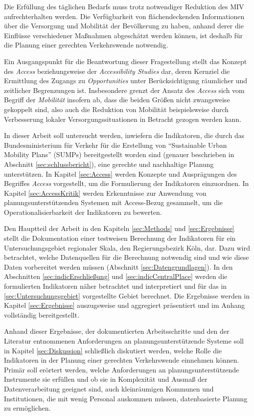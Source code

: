 \documentclass[11pt,pdftex,a4paper]{scrartcl}
\begin{document}
	Die Erfüllung des täglichen Bedarfs muss trotz notwendiger Reduktion des MIV aufrechterhalten werden. Die Verfügbarkeit von flächendeckenden Informationen über die Versorgung und Mobilität der Bevölkerung zu haben, anhand derer die Einflüsse verschiedener Maßnahmen abgeschätzt werden können, ist deshalb für die Planung einer gerechten Verkehrswende notwendig.
	
	Ein Ausgangspunkt für die Beantwortung dieser Fragestellung stellt das Konzept des \textit{Access} beziehungsweise der \textit{Accessibility Studies} dar, deren Kernziel die Ermittlung des Zugangs zu \textit{Opportunities} unter Berücksichtigung räumlicher und zeitlicher Begrenzungen ist. Insbesondere grenzt der Ansatz des \textit{Access} sich vom Begriff der \textit{Mobilität} insofern ab, dass die beiden Größen nicht zwangsweise gekoppelt sind, also auch die Reduktion von Mobilität beispielsweise durch Verbesserung lokaler Versorgungssituationen in Betracht gezogen werden kann.
	
	In dieser Arbeit soll untersucht werden, inwiefern die Indikatoren, die durch das Bundesministerium für Verkehr für die Erstellung von \enquote{Sustainable Urban Mobility Plans} (SUMPs) bereitgestellt worden sind (genauer beschrieben in Abschnitt \ref{sec:schlussbericht}), eine gerechte und nachhaltige Planung unterstützen. In Kapitel \ref{sec:Access} werden Konzepte und Ausprägungen des Begriffes \textit{Access} vorgestellt, um die Formulierung der Indikatoren einzuordnen. In Kapitel \ref{sec:AccessKritik} werden Erkenntnisse zur Anwendung von planungsunterstützenden Systemen mit Access-Bezug gesammelt, um die Operationalisierbarkeit der Indikatoren zu bewerten.
	
	Den Hauptteil der Arbeit in den Kapiteln \ref{sec:Methods} und \ref{sec:Ergebnisse} stellt die Dokumentation einer testweisen Berechnung der Indikatoren für ein Untersuchungsgebiet regionaler Skala, den Regierungsbezirk Köln, dar. Dazu wird betrachtet, welche Datenquellen für die Berechnung notwendig sind und wie diese Daten vorbereitet werden müssen (Abschnitt \ref{sec:Datengrundlagen}). In den Abschnitten \ref{sec:indicErschließung} und \ref{sec:indicCentralPlace} werden die formulierten Indikatoren näher betrachtet und interpretiert und für das in \ref{sec:Untersuchungsgebiet} vorgestellte Gebiet berechnet. Die Ergebnisse werden in Kapitel \ref{sec:Ergebnisse} auszugsweise und aggregiert präsentiert und im Anhang vollständig bereitgestellt.
	
	Anhand dieser Ergebnisse, der dokumentierten Arbeitsschritte und den der Literatur entnommenen Anforderungen an planungsunterstützende Systeme soll in Kapitel \ref{sec:Diskussion} schließlich diskutiert werden, welche Rolle die Indikatoren in der Planung einer gerechten Verkehrswende einnehmen können. Primär soll erörtert werden, welche Anforderungen an planungsunterstützende Instrumente sie erfüllen und ob sie in Komplexität und Ausmaß der Datenverarbeitung geeignet sind, auch kleinräumigen Kommunen und Institutionen, die mit wenig Personal auskommen müssen, datenbasierte Planung zu ermöglichen.
	
\end{document}
